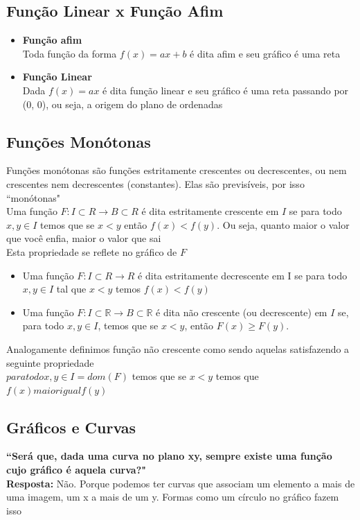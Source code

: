 \documentclass{article}
\begin{document}
\subsection{Função Linear x Função Afim}
\begin{itemize}
    \item \textbf{Função afim}
    \\[5pt]
    Toda função da forma $f(x) = ax + b$ é dita afim e seu gráfico é uma reta
    \item \textbf{Função Linear}
    \\[5pt]
    Dada $f(x) = ax$ é dita função linear e seu gráfico é uma reta passando por (0, 0), ou seja, a origem do plano de ordenadas
\end{itemize}

\subsection{Funções Monótonas}
Funções monótonas são funções estritamente crescentes ou decrescentes, ou nem crescentes nem decrescentes (constantes). Elas são previsíveis, por isso ``monótonas"
\\[10pt]
Uma função $F: I \subset R \xrightarrow{} B \subset R$ é dita estritamente crescente em $I$ se para todo $x, y \in I$ temos que se $x < y$ então $f(x) < f(y)$. Ou seja, quanto maior o valor que você enfia, maior o valor que sai
\\[10pt]
Esta propriedade se reflete no gráfico de $F$

\begin{itemize}
    \item Uma função $F: I \subset R \xrightarrow{} R$ é dita estritamente decrescente em I se para todo $x, y \in I$ tal que $x < y$ temos $f(x) < f(y)$
    
    \item Uma função $F: I \subset \mathbb{R} \to B \subset \mathbb{R}$ é dita não crescente (ou decrescente) em $I$ se, para todo $x, y \in I$, temos que se $x < y$, então $F(x) \geq F(y)$.
\end{itemize}

Analogamente definimos função não crescente como sendo aquelas satisfazendo a seguinte propriedade
\\[5pt]
$para todox, y \in I = dom(F)$ temos que se $x < y$ temos que $f(x) maiorigual f(y)$

\subsection{Gráficos e Curvas}
\textbf{``Será que, dada uma curva no plano xy, sempre existe uma função cujo gráfico é aquela curva?"}
\\[5pt]
\textbf{Resposta:} Não. Porque podemos ter curvas que associam um elemento a mais de uma imagem, um x a mais de um y. Formas como um círculo no gráfico fazem isso
\end{document}
